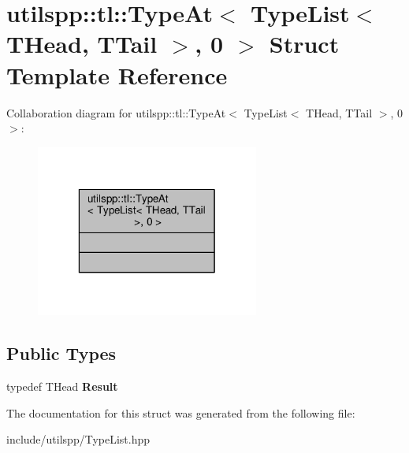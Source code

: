 \hypertarget{structutilspp_1_1tl_1_1TypeAt_3_01TypeList_3_01THead_00_01TTail_01_4_00_010_01_4}{\section{utilspp\-:\-:tl\-:\-:Type\-At$<$ Type\-List$<$ T\-Head, T\-Tail $>$, 0 $>$ Struct Template Reference}
\label{structutilspp_1_1tl_1_1TypeAt_3_01TypeList_3_01THead_00_01TTail_01_4_00_010_01_4}
}


Collaboration diagram for utilspp\-:\-:tl\-:\-:Type\-At$<$ Type\-List$<$ T\-Head, T\-Tail $>$, 0 $>$\-:\nopagebreak
\begin{figure}[H]
\begin{center}
\leavevmode
\includegraphics[width=208pt]{structutilspp_1_1tl_1_1TypeAt_3_01TypeList_3_01THead_00_01TTail_01_4_00_010_01_4__coll__graph}
\end{center}
\end{figure}
\subsection*{Public Types}
\begin{DoxyCompactItemize}
\item 
\hypertarget{structutilspp_1_1tl_1_1TypeAt_3_01TypeList_3_01THead_00_01TTail_01_4_00_010_01_4_a21b25878f4dc0221c59aba804ecfabff}{typedef T\-Head {\bfseries Result}}\label{structutilspp_1_1tl_1_1TypeAt_3_01TypeList_3_01THead_00_01TTail_01_4_00_010_01_4_a21b25878f4dc0221c59aba804ecfabff}

\end{DoxyCompactItemize}


The documentation for this struct was generated from the following file\-:\begin{DoxyCompactItemize}
\item 
include/utilspp/Type\-List.\-hpp\end{DoxyCompactItemize}
